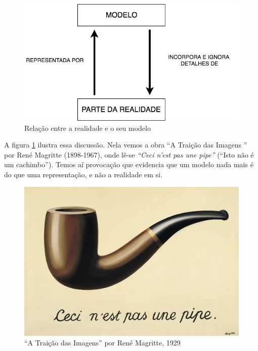 \begin{figure}[htb]
	\caption{Relação entre a realidade e o seu modelo}
	\begin{center}
	    \includegraphics[scale=0.65]{imagens/modelo_e_realidade.png}
	\end{center}
\end{figure}

A figura \ref{fig:pipe} ilustra essa discussão. Nela vemos a obra ``A Traição das Imagens '' por René Magritte (1898-1967), onde lê-se \textit{``Ceci n'est pas une pipe''} (``Isto não é um cachimbo''). Temos aí provocação que evidencia que um modelo nada mais é do que uma representação, e não a realidade em si.

\begin{figure}[htb]
	\caption{``A Traição das Imagens'' por René Magritte, 1929}
	\begin{center}
	    \includegraphics[scale=0.75]{imagens/pipe}
	\end{center}
	\label{fig:pipe}
\end{figure}

